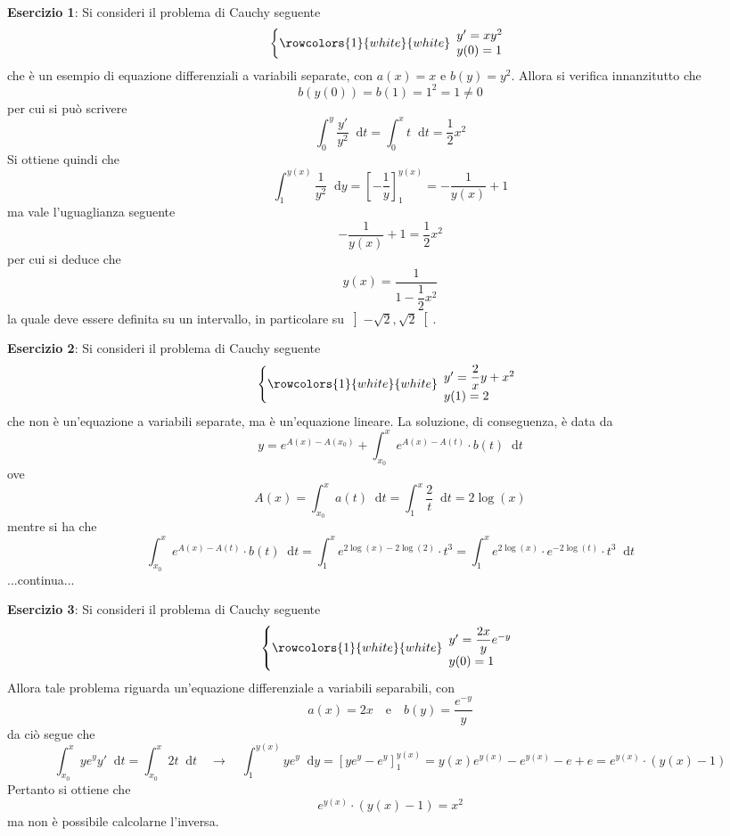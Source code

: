 \documentclass[a4paper]{extarticle}
\newcommand*\dif{\mathop{}\!\mathrm{d}}
\begin{document}
\vspace{2em}
\noindent
\textbf{Esercizio 1}: Si consideri il problema di Cauchy seguente
\[\left\{
    \rowcolors{1}{white}{white}
    \begin{array}{lll}
        y'= x y^2\\
        y(0)=1
    \end{array}
\right.\]
che è un esempio di equazione differenziali a variabili separate, con $a(x)=x$ e $b(y)=y^2$. Allora si verifica innanzitutto che
\[b(y(0))=b(1)=1^2=1 \neq 0\]
per cui si può scrivere
\[\int_0^y \dfrac{y'}{y^2} \dif t = \int_0^x t \dif t = \dfrac{1}{2}x^2\]
Si ottiene quindi che
\[\int_1^{y(x)} \dfrac{1}{y^2} \dif y = \left[-\dfrac{1}{y}\right]_1^{y(x)} = -\dfrac{1}{y(x)} + 1\]
ma vale l'uguaglianza seguente
\[-\dfrac{1}{y(x)} + 1 = \dfrac{1}{2}x^2\]
per cui si deduce che
\[y(x)=\dfrac{1}{1-\dfrac{1}{2}x^2}\]
la quale deve essere definita su un intervallo, in particolare su $\left]-\sqrt{2},\sqrt{2}\right[$.

\vspace{2em}
\noindent
\textbf{Esercizio 2}: Si consideri il problema di Cauchy seguente
\[\left\{
    \rowcolors{1}{white}{white}
    \begin{array}{lll}
        y'= \dfrac{2}{x} y + x^2\\
        y(1)=2
    \end{array}
\right.\]
che non è un'equazione a variabili separate, ma è un'equazione lineare. La soluzione, di conseguenza, è data da
\[y=e^{A(x)-A(x_0)} + \int_{x_0}^x e^{A(x)-A(t)} \cdot b(t) \dif t\]
ove
\[A(x)=\int_{x_0}^x a(t) \dif t = \int_{1}^x \dfrac{2}{t} \dif t = 2 \log(x)\]
mentre si ha che 
\[\int_{x_0}^x e^{A(x)-A(t)} \cdot b(t) \dif t = \int_{1}^x e^{2 \log(x)-2\log(2)} \cdot t^3 = \int_{1}^x e^{2 \log(x)} \cdot e^{-2\log(t)} \cdot t^3 \dif t\]
...continua...

\vspace{2em}
\noindent
\textbf{Esercizio 3}: Si consideri il problema di Cauchy seguente
\[\left\{
    \rowcolors{1}{white}{white}
    \begin{array}{lll}
        y'= \dfrac{2x}{y}e^{-y}\\
        y(0)=1
    \end{array}
\right.\]
Allora tale problema riguarda un'equazione differenziale a variabili separabili, con
\[a(x)=2x \hspace{1em} \text{e} \hspace{1em} b(y)=\dfrac{e^{-y}}{y}\]
da ciò segue che
\[\int_{x_0}^x ye^y y' \dif t = \int_{x_0}^x 2t \dif t \hspace{1em} \rightarrow \hspace{1em} \int_1^{y(x)} ye^y \dif y = \left[ye^y - e^y\right]_1^{y(x)} = y(x) e^{y(x)} - e^{y(x)} - e + e = e^{y(x)} \cdot (y(x)-1)\]
Pertanto si ottiene che
\[e^{y(x)} \cdot (y(x)-1)=x^2\]
ma non è possibile calcolarne l'inversa.
\end{document}

